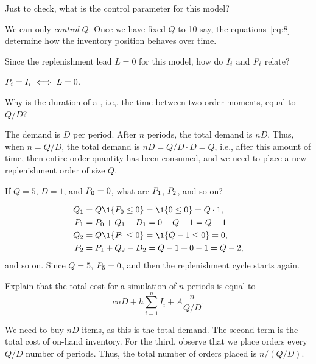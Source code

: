 \begin{exercise}
  Just to check, what is the control parameter for this model? 
  \begin{solution}
 We can only \emph{control} $Q$. Once we have fixed $Q$ to 10 say, the equations~\eqref{eq:8} determine how the inventory position behaves over time. 
  \end{solution}
\end{exercise}

\begin{exercise}
Since the replenishment lead $L=0$ for this model, how do $I_i$ and $P_i$ relate?
\begin{solution}
  $P_i = I_i \iff L=0$.
\end{solution}
\end{exercise}

\begin{exercise}
  Why is the duration of a , i.e,. the time between two order moments, equal to $Q/D$?
  \begin{solution}
    The demand is $D$ per period. After $n$ periods, the total demand is $nD$. Thus, when $n=Q/D$, the total demand is $n D = Q/D \cdot D = Q$, i.e., after this amount of time, then entire order quantity has been consumed, and we need to place a new replenishment order of size $Q$. 
  \end{solution}
\end{exercise}

\begin{exercise}
  If $Q=5$, $D=1$, and $P_0=0$, what are $P_1$, $P_2$, and so on?
  \begin{solution}
    \begin{align*}
      Q_1 &= Q \1{\IP_{0}\leq 0} = \1{0 \leq 0} = Q\cdot 1, \\
      \IP_1 &= \IP_0 + Q_1 - D_1 = 0 + Q - 1 = Q-1 \\
      Q_2 &= Q \1{\IP_{1}\leq 0} = \1{Q - 1 \leq 0} = 0, \\
      \IP_2 &= \IP_1 + Q_2 - D_2 = Q-1 + 0 - 1 = Q-2, \\
    \end{align*}
and so on. Since $Q=5$, $P_5=0$, and then the replenishment cycle starts again.
  \end{solution}
\end{exercise}

\begin{exercise}
  Explain that the total cost for a simulation of $n$ periods is equal to
  \begin{equation}\label{eq:eoq1}
    c n D + h \sum_{i=1}^n I_i + A\frac{n}{Q/D}.
  \end{equation}
  \begin{solution}
    We need to buy $n D$ items, as this is the total demand. The second term is the total cost of on-hand inventory. For the third, observe that we place orders every $Q/D$ number of periods. Thus, the total number of orders placed is $n/(Q/D)$. 
  \end{solution}
\end{exercise}

